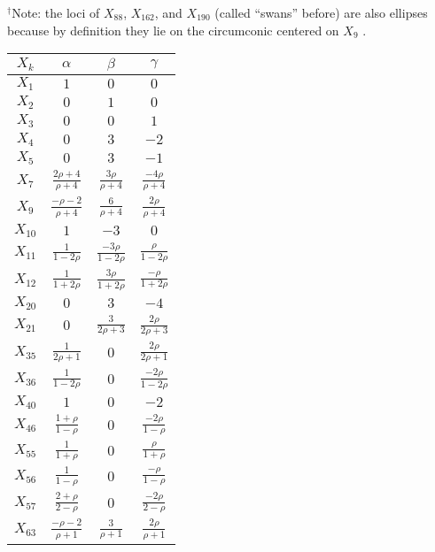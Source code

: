 $^\dagger$Note: the loci of $X_{88}$, $X_{162}$, and $X_{190}$ (called ``swans'' before) are also ellipses because by definition they lie on the circumconic centered on $X_9$ \cite[X(9)]{etc}.

\begin{table}
\begin{minipage}{2.0in}
\begin{tabular}{|c|c|c|c|}
\hline
$X_k$ & $\alpha$ & $\beta$ & $\gamma$ \\
\hline$X_1$ &$1$ & $0$ & $0$ \\
$X_2$ & $0$ & $1$ & $0$  \\
$X_3$ & $0$ & $0$ & $1$  \\
$X_4$ & $0$ & $3$ & $-2$ \\
$X_5$ & $0$ & $3$ & $-1$ \\
$X_{7}$ & $\frac{2\rho+4}{\rho+4}$ & $\frac{3\rho}{\rho+4}$ & $\frac{-4\rho}{\rho+4}$  \\
$X_9$ & $\frac{-\rho-2}{\rho+4}$ & $\frac{6}{\rho+4}$ & $\frac{2\rho}{\rho+4}$\\
$X_{10}$ & $1$ & $-3$ & $0$  \\
$X_{11}$ & $\frac{1}{1-2\rho}$ & $\frac{-3\rho}{1-2\rho}$ &  $\frac{\rho}{1-2\rho}$  \\ 
$X_{12}$ & $\frac{1}{1+2\rho}$ & $\frac{3\rho}{1+2\rho}$ &  $\frac{-\rho}{1+2\rho}$  \\ 
$X_{20}$ & $0$ & $3$ & $-4$ \\
$X_{21}$ & $0$ & $\frac{3}{2\rho+3}$ & $\frac{2\rho}{2\rho+3}$  \\
$X_{35}$ & $\frac{1}{2\rho+1}$ &  $0$ & $\frac{2\rho}{2\rho+1}$ \\
$X_{36}$ & $\frac{1}{1-2\rho}$ & $0$ & $\frac{-2\rho}{1-2\rho}$  \\
$X_{40}$ & $1$ & $0$ & $-2$ \\
$X_{46}$ & $\frac{1+\rho}{1-\rho}$ & $0$ & $\frac{-2\rho}{1-\rho}$ \\
$X_{55}$ & $\frac{1}{1+\rho}$ & $0$ & $\frac{\rho}{1+\rho}$  \\
$X_{56}$ & $\frac{1}{1-\rho}$ & $0$ & $\frac{-\rho}{1-\rho}$ \\
$X_{57}$ & $\frac{2+\rho}{2-\rho}$ & $0$ & $\frac{-2\rho}{2-\rho}$  \\
$X_{63}$ & $\frac{-\rho-2}{\rho+1}$ & $\frac{3}{\rho+1}$ &  $\frac{2\rho}{\rho+1}$\\
\hline
\end{tabular}
\end{minipage}
\begin{minipage}{2.0in}

\end{minipage}
\end{table}
